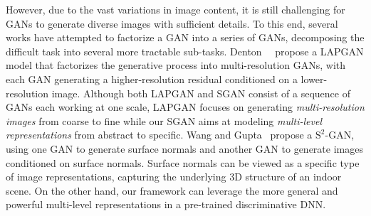 \documentclass[10pt,twocolumn,letterpaper]{article}
\begin{document}



However, due to the vast variations in image content, it is still challenging for GANs to generate diverse images with sufficient details. %
To this end, several works have attempted to factorize a GAN into a series of GANs, decomposing the difficult task into several more tractable sub-tasks. Denton~\etal~\cite{denton2015deep} propose a LAPGAN model that factorizes the generative process  into multi-resolution GANs, with each GAN generating a higher-resolution residual conditioned on a lower-resolution image. Although both LAPGAN and SGAN consist of a sequence of GANs each working at one scale, LAPGAN focuses on generating \emph{multi-resolution images} from coarse to fine while our SGAN aims at modeling \emph{multi-level representations} from abstract to specific. %
Wang and Gupta~\cite{wang2016generative} propose a $\mathrm{S^{2}}$-GAN, using one GAN to generate  surface normals and another GAN to generate images conditioned on surface normals. Surface normals can be viewed as a specific type of image representations, capturing the underlying 3D structure of an indoor scene. On the other hand, our framework can leverage the more general and powerful multi-level representations in a pre-trained discriminative DNN. 
\end{document}
